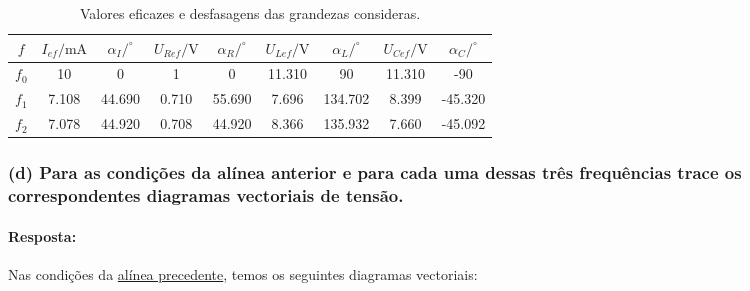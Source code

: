 \begin{table}[ht]
    \centering
    \caption{Valores eficazes e desfasagens das grandezas consideras.}
    \label{tab1}
    \begin{tabular}{SSSSSSSSS} \toprule
        $f$ & $I_{ef}/\text{mA}$ & $\alpha_I/^{\circ}$ & $U_{Ref}/\text{V}$ & $\alpha_R/^{\circ}$ & $U_{Lef}/\text{V}$ & $\alpha_L/^{\circ}$ & $U_{Cef}/\text{V}$ & $\alpha_C/^{\circ}$ \\ \midrule
        $f_0$  & 10 & 0 & 1 & 0 & 11.310 & 90 & 11.310 & -90\\
        $f_1$  & 7.108 & 44.690 & 0.710 & 55.690 & 7.696 & 134.702 & 8.399 & -45.320\\
        $f_2$ & 7.078 & 44.920 & 0.708 & 44.920 & 8.366 & 135.932 & 7.660 & -45.092\\ \bottomrule
    \end{tabular}
\end{table}
\subsubsection*{(d) Para as condições da alínea anterior e para cada uma dessas três frequências trace os correspondentes diagramas vectoriais de tensão.}
\paragraph{Resposta:}
Nas condições da \hyperref[subsubsec_c]{alínea precedente}, temos os seguintes diagramas vectoriais:

